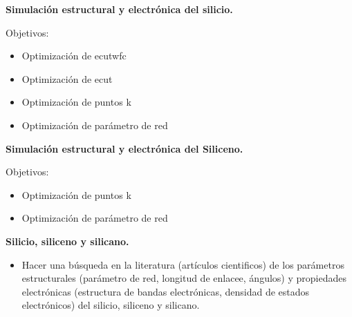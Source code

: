 \textbf{Simulación estructural y electrónica del silicio.}

\vspace{0.4cm}

Objetivos:

\begin{itemize}
    \item Optimización de ecutwfc
    \item Optimización de ecut
    \item Optimización de puntos k
    \item Optimización de parámetro de red
\end{itemize}

\vspace{0.4cm}

\textbf{Simulación estructural y electrónica del Siliceno.}

\vspace{0.4cm}

Objetivos:

\begin{itemize}
    \item Optimización de puntos k
    \item Optimización de parámetro de red
\end{itemize}

\vspace{0.4cm}

\textbf{ Silicio, siliceno y silicano.}

\begin{itemize}
    \item Hacer una búsqueda en la literatura (artículos cientificos) de los parámetros 
          estructurales (parámetro de red, longitud de enlacee, ángulos) y propiedades
          electrónicas (estructura de bandas electrónicas, densidad de estados electrónicos)
          del silicio, siliceno y silicano.
\end{itemize}